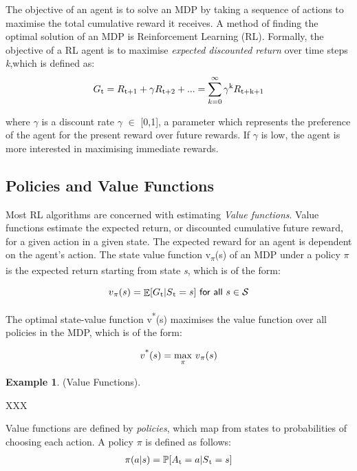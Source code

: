 \documentclass[11pt,twoside]{report}
\theoremstyle{plain}
\theoremstyle{definition}
\DeclareMathOperator{\E}{\mathbb{E}}
\newtheorem{examp}{Example}[section]
\begin{document}
The objective of an agent is to solve an MDP by taking a sequence of actions to maximise the total cumulative reward it receives. 
A method of finding the optimal solution of an MDP is Reinforcement Learning (RL). 
Formally, the objective of a RL agent is to maximise \textit{expected discounted return} over time steps \textit{k},which is defined as:
\begin{equation}
\begin{split}
G\textsubscript{t} = R\textsubscript{t+1} + \gamma R \textsubscript{t+2} + ...  = \sum_{k=0}^{\infty} \gamma\textsuperscript{k} R\textsubscript{t+k+1} 
\end{split}
\end{equation}

where $\gamma$ is a discount rate $\gamma$ $\in$ [0,1], a parameter which represents the preference of the agent for the present reward over future rewards. If $\gamma$ is low, the agent is more interested in maximising immediate rewards. 

\subsection{Policies and Value Functions}
\label{policy_value_functions_subsection}
Most RL algorithms are concerned with estimating \textit{Value functions}.
Value functions estimate the expected return, or discounted cumulative future reward,  for a given action in a given state. The expected reward for an agent is dependent on the agent's action.  
The state value function v\textsubscript{$\pi$}(s) of an MDP under a policy $\pi$ is the expected return starting from state \textit{s}, which is of the form:

\begin{equation}
v\textsubscript{$\pi$}(s) = \displaystyle \E [G\textsubscript{t} \vert S\textsubscript{t} = s] \ \textsf{for all}\ s \in \mathcal{S}
\end{equation}

The optimal state-value function v\textsuperscript{*}(s) maximises the value function over all policies in the MDP, which is of the form:

\begin{equation}
v\textsuperscript{*}(s) = \underset{\pi}{\max} \ v\textsubscript{$\pi$}(s)
\end{equation}

\begin{examp} \normalfont (Value Functions).

XXX
\end{examp}
Value functions are defined by \textit{policies}, which map from states to probabilities of choosing each action. 
A policy $\pi$ is defined as follows:
\begin{equation}
\label{eq:policy}
\begin{split}
\pi(a|s) =  \displaystyle \mathbb{P}[A\textsubscript{t} = a | S\textsubscript{t} = s]
\end{split}
\end{equation}
\end{document}
